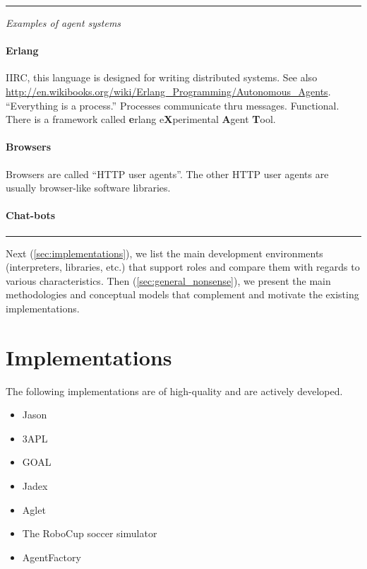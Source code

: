 \documentclass{article}
\newcommand{\fb}[1]{\textbf{#1}}
\newenvironment{notes}{\medskip\hrule\smallskip\narrower}{\smallskip\hrule\medskip}
\begin{document}
\begin{notes}
\emph{Examples of agent systems}

\paragraph{Erlang}
IIRC, this language is designed for writing distributed systems.
See also \url{http://en.wikibooks.org/wiki/Erlang_Programming/Autonomous_Agents}.
``Everything is a process.''
Processes communicate thru messages.
Functional.
There is a framework called \fb erlang e\fb Xperimental \fb Agent \fb Tool.

\paragraph{Browsers}
Browsers are called ``HTTP user agents''.
The other HTTP user agents are usually browser-like software libraries.

\paragraph{Chat-bots}

\end{notes}

Next (\autoref{sec:implementations}), we list the main development environments (interpreters, libraries, etc.) that support roles and compare them with regards to various characteristics.
Then (\autoref{sec:general_nonsense}), we present the main methodologies and conceptual models  that complement and motivate the existing implementations.

\section{Implementations}\label{sec:implementations} %

The following implementations are of high-quality and are actively developed.
\begin{itemize}
\item Jason~\cite{books/sp/map2005/BordiniHV05}
\item 3APL~\cite{books/sp/map2005/DastaniRM05}
\item GOAL~\cite{hindriks2009programmingrationalagents}
\item Jadex~\cite{todo}
\item Aglet~\cite{todo}
\item The RoboCup soccer simulator
\item AgentFactory
\end{itemize}
\end{document}
